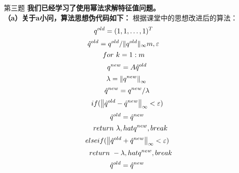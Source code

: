 \documentclass[12pt,a4paper,utf8]{ctexart}
\begin{document}
\begin{enumerate}
\newpage
\item[第三题]
\textbf{我们已经学习了使用幂法求解特征值问题。} \\
{\bfseries \quad（a）关于a小问，算法思想伪代码如下：}
根据课堂中的思想改进后的算法：\\
\begin{equation}
q^{old} = (1,1,\ldots,1)^T \\
\end{equation}
\begin{equation}
\hat{q}^{old} = q^{old} / \|q^{old}\|_\infty\\
m,\varepsilon\\
\end{equation}
\begin{equation}
for~ k = 1:m\\
\end{equation}
\begin{equation}
\quad q^{new} = A\hat{q}^{old}\\
\end{equation}
\begin{equation}
\quad \lambda =  \left\|q^{new}\right\|_{\infty} \\
\end{equation}
\begin{equation}
\quad \hat{q}^{new} = q^{new} / \lambda\\
\end{equation}
\begin{equation}
\quad if( \left\|\hat{q}^{old} - \hat{q}^{new} \right\|_\infty < \varepsilon)\\
\end{equation}
\begin{equation}
\quad \hat{q}^{old} = \hat{q}^{new}\\
\end{equation}
\begin{equation}
\quad \quad return ~\lambda,hat{q}^{new},break\\
\end{equation}
\begin{equation}
\quad elseif( \left\|\hat{q}^{old} + \hat{q}^{new} \right\|_\infty  < \varepsilon)\\
\end{equation}
\begin{equation}
\quad \quad return~ -\lambda,hat{q}^{new},break\\
\end{equation}
\begin{equation}
\quad \hat{q}^{old} = \hat{q}^{new}\\

\end{equation}
\end{enumerate}
\end{document}
